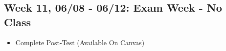 \documentclass[11pt,]{article}
\providecommand{\tightlist}{%
  \setlength{\itemsep}{0pt}\setlength{\parskip}{0pt}}
\begin{document}
\subsection{Week 11, 06/08 - 06/12: Exam Week - No
Class}\label{week-11-0608---0612-exam-week---no-class}

\begin{itemize}
\tightlist
\item
  Complete Post-Test (Available On Canvas)
\end{itemize}
\end{document}
